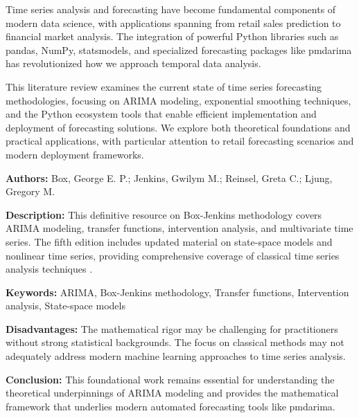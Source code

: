 %
%
%


%


\STANDARD{}
{
	
	Time series analysis and forecasting have become fundamental components of modern data science, with applications spanning from retail sales prediction to financial market analysis. The integration of powerful Python libraries such as pandas, NumPy, statsmodels, and specialized forecasting packages like pmdarima has revolutionized how we approach temporal data analysis.
	
	This literature review examines the current state of time series forecasting methodologies, focusing on ARIMA modeling, exponential smoothing techniques, and the Python ecosystem tools that enable efficient implementation and deployment of forecasting solutions. We explore both theoretical foundations and practical applications, with particular attention to retail forecasting scenarios and modern deployment frameworks.
	
}


{ 
	
	\textbf{Authors:}
	Box, George E. P.; Jenkins, Gwilym M.; Reinsel, Greta C.; Ljung, Gregory M.
	
	\textbf{Description:}
	This definitive resource on Box-Jenkins methodology covers ARIMA modeling, transfer functions, intervention analysis, and multivariate time series. The fifth edition includes updated material on state-space models and nonlinear time series, providing comprehensive coverage of classical time series analysis techniques \autocite{Box:2016}.
	
	\textbf{Keywords:}
	ARIMA, Box-Jenkins methodology, Transfer functions, Intervention analysis, State-space models
	
	\textbf{Disadvantages:}
	The mathematical rigor may be challenging for practitioners without strong statistical backgrounds. The focus on classical methods may not adequately address modern machine learning approaches to time series analysis.
	
	\textbf{Conclusion:}
	This foundational work remains essential for understanding the theoretical underpinnings of ARIMA modeling and provides the mathematical framework that underlies modern automated forecasting tools like pmdarima.
	
}

